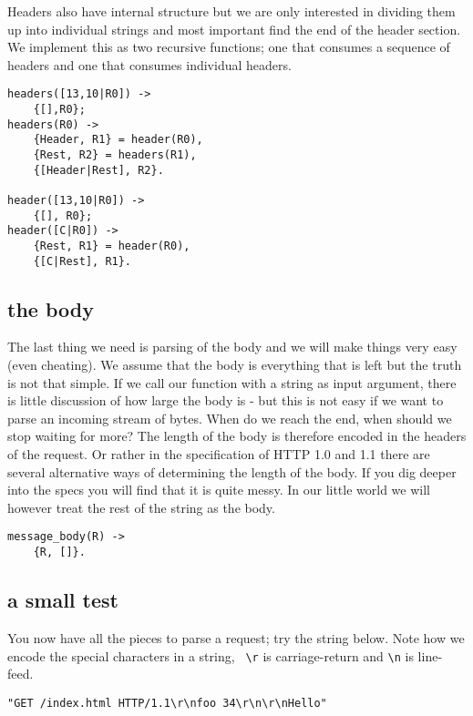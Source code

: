 \documentclass[a4paper,11pt]{article}
\begin{document}
Headers also have internal structure but we are only interested in
dividing them up into individual strings and most important find the
end of the header section. We implement this as two recursive functions;
one that consumes a sequence of headers and one that consumes
individual headers.


\begin{verbatim}
headers([13,10|R0]) ->
    {[],R0};
headers(R0) ->
    {Header, R1} = header(R0),
    {Rest, R2} = headers(R1),
    {[Header|Rest], R2}.

header([13,10|R0]) ->
    {[], R0};
header([C|R0]) ->
    {Rest, R1} = header(R0),
    {[C|Rest], R1}.     
\end{verbatim}    

\subsection{the body}

The last thing we need is parsing of the body and we will make things
very easy (even cheating). We assume that the body is everything that
is left but the truth is not that simple. If we call our function with
a string as input argument, there is little discussion of how large the
body is -  but this is not easy if we want to parse an incoming stream
of bytes. When do we reach the end, when should we stop waiting for
more? The length of the body is therefore encoded in the headers of
the request. Or rather in the specification of HTTP 1.0 and 1.1 there
are several alternative ways of determining the length of the
body. If you dig deeper into the specs you will find that it is quite
messy. In our little world we will however treat the rest of the string
as the body.

\begin{verbatim}
message_body(R) ->
    {R, []}.
\end{verbatim}    

\subsection{a small test}

You now have all the pieces to parse a request; try the string
below. Note how we encode the special characters in a string, {\tt
  \textbackslash r} is carriage-return and {\tt \textbackslash n} is
line-feed.

\begin{verbatim}
"GET /index.html HTTP/1.1\r\nfoo 34\r\n\r\nHello"
\end{verbatim}
\end{document}
